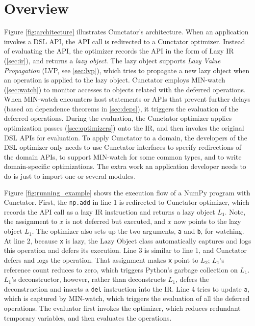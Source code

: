 \documentclass[sigconf]{acmart}\settopmatter{printfolios=true,printccs=false,printacmref=false}\setcopyright{none}
\begin{document}
\section{Overview}

Figure \ref{fig:architecture} illustrates Cunctator's architecture. When an application invokes a DSL API, the API call is redirected to a Cunctator optimizer. Instead of evaluating the API, the optimizer records the API in the form of Lazy IR (\cref{sec:ir}), and returns a \textit{lazy object}. The lazy object supports  \textit{Lazy Value Propagation} (LVP, see \cref{sec:lvp}), which tries to propagate a new lazy object when an operation is applied to the lazy object. Cunctator employs MIN-watch (\cref{sec:watch}) to monitor accesses to objects related with the deferred operations. When MIN-watch encounters host statements or APIs that prevent further delays (based on dependence theorems in \cref{sec:deps}), it triggers the evaluation of the deferred operations. During the evaluation, the Cunctator optimizer applies optimization passes (\cref{sec:optimizers}) onto the IR, and then invokes the original DSL APIs for evaluation. To apply Cunctator to a domain, the developers of the DSL optimizer only needs to use Cunctator interfaces to specify redirections of the domain APIs, to support MIN-watch for some common types, and to write domain-specific optimizations. The extra work an application developer needs to do is just to import one or several modules.


Figure \ref{fig:running_example} shows the execution flow of a NumPy program with Cunctator. First, the \texttt{np.add} in line 1 is redirected to Cunctator optimizer, which records the API call as a lazy IR instruction and returns a lazy object $L_1$. Note, the assignment to $x$ is not deferred but executed, and $x$ now points to the lazy object $L_1$. The optimizer also sets up the two arguments, \texttt{a} and \texttt{b}, for watching. At line 2, because \texttt{x} is lazy, the Lazy Object class automatically captures and logs this operation and defers its execution. Line 3 is similar to line 1, and Cunctator defers and logs the operation. That assignment makes \texttt{x} point to $L_2$; $L_1$'s reference count reduces to zero, which triggers Python's garbage collection on $L_1$. $L_1$'s deconstructor, however, rather than deconstructs $L_1$, defers the deconstruction and inserts a \texttt{del} instruction into the IR. Line 4 tries to update \texttt{a}, which is captured by MIN-watch, which triggers the evaluation of all the deferred operations. The evaluator first invokes the optimizer, which reduces redundant temporary variables, and then evaluates the operations.
\end{document}
